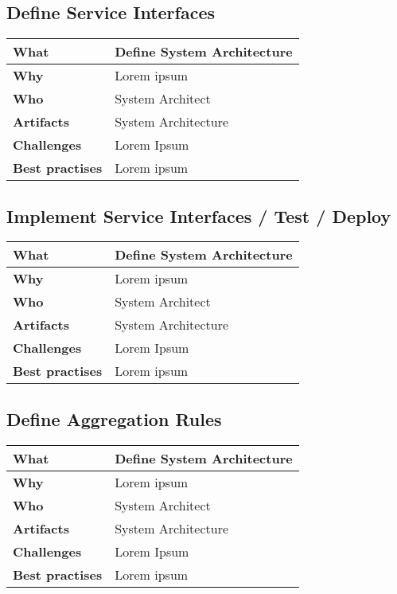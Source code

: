 \subsection{Define Service Interfaces}
 \label{table:ch6_Task_Define_System_Architect}
\begin{tabular}
	{|m{3cm}|m{10cm}|} \hline \bfseries What & Define System Architecture\\
	\hline \bfseries Why & Lorem ipsum\\
	\hline \bfseries Who & System Architect\\
	\hline \bfseries Artifacts & System Architecture\\
	\hline \bfseries Challenges & Lorem Ipsum\\
	\hline \bfseries Best practises & Lorem ipsum\\
	\hline 
\end{tabular}

\subsection{Implement Service Interfaces / Test / Deploy}
 \label{table:ch6_Task_Define_System_Architect}
\begin{tabular}
	{|m{3cm}|m{10cm}|} \hline \bfseries What & Define System Architecture\\
	\hline \bfseries Why & Lorem ipsum\\
	\hline \bfseries Who & System Architect\\
	\hline \bfseries Artifacts & System Architecture\\
	\hline \bfseries Challenges & Lorem Ipsum\\
	\hline \bfseries Best practises & Lorem ipsum\\
	\hline 
\end{tabular}

\subsection{Define Aggregation Rules}
 \label{table:ch6_Task_Define_System_Architect}
\begin{tabular}
	{|m{3cm}|m{10cm}|} \hline \bfseries What & Define System Architecture\\
	\hline \bfseries Why & Lorem ipsum\\
	\hline \bfseries Who & System Architect\\
	\hline \bfseries Artifacts & System Architecture\\
	\hline \bfseries Challenges & Lorem Ipsum\\
	\hline \bfseries Best practises & Lorem ipsum\\
	\hline 
\end{tabular}

